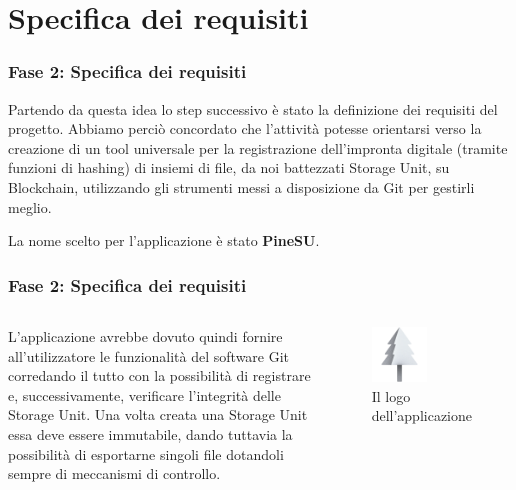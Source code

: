 \documentclass{beamer}
\begin{document}
\section{Specifica dei requisiti}
\begin{frame}
	\frametitle{Fase 2: Specifica dei requisiti}
	Partendo da questa idea lo step successivo è stato la definizione dei requisiti del progetto. Abbiamo perciò concordato che l’attività potesse orientarsi verso la creazione di un tool universale per la registrazione dell’impronta digitale (tramite funzioni di hashing) di insiemi di file, da noi battezzati Storage Unit, su Blockchain, utilizzando gli strumenti messi a disposizione da Git per gestirli meglio.

	La nome scelto per l'applicazione è stato \textbf{PineSU}.
\end{frame}
\begin{frame}
	\frametitle{Fase 2: Specifica dei requisiti}
	\begin{columns}
		L'applicazione avrebbe dovuto quindi fornire all'utilizzatore le funzionalità del software Git corredando il tutto con la possibilità di registrare e, successivamente, verificare l'integrità delle Storage Unit. Una volta creata una Storage Unit essa deve essere immutabile, dando tuttavia la possibilità di esportarne singoli file dotandoli sempre di meccanismi di controllo.
		\begin{figure}
			\includegraphics[width=0.55\textwidth]{figures/favicon.png}
			\caption{Il logo dell'applicazione}
		\end{figure}
	\end{columns}
\end{frame}
\end{document}
